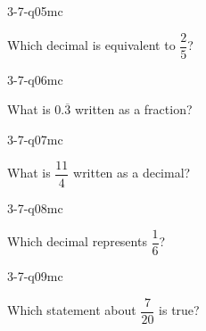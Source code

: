 \begin{practiceQuestion}{3-7-q05}{mc}
\begin{questionText}
Which decimal is equivalent to $\dfrac{2}{5}$?
\end{questionText}
\end{practiceQuestion}

\begin{practiceQuestion}{3-7-q06}{mc}
\begin{questionText}
What is $0.\overline{3}$ written as a fraction?
\end{questionText}
\end{practiceQuestion}

\begin{practiceQuestion}{3-7-q07}{mc}
\begin{questionText}
What is $\dfrac{11}{4}$ written as a decimal?
\end{questionText}
\end{practiceQuestion}

\begin{practiceQuestion}{3-7-q08}{mc}
\begin{questionText}
Which decimal represents $\dfrac{1}{6}$?
\end{questionText}
\end{practiceQuestion}

\begin{practiceQuestion}{3-7-q09}{mc}
\begin{questionText}
Which statement about $\dfrac{7}{20}$ is true?
\end{questionText}
\end{practiceQuestion}


